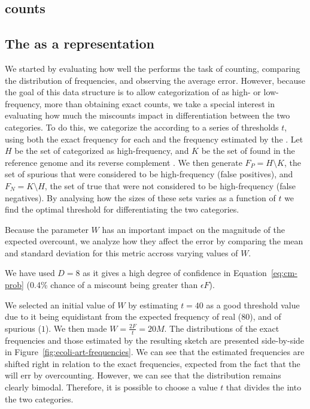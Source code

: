 \subsection{\kmer counts}

\subsection{The \dBCM as a \dBG representation}

We started by evaluating how well the \dBCM performs the task of \kmer counting, comparing the distribution of frequencies, and observing the average error. However, because the goal of this data structure is to allow categorization of  as high- or low-frequency, more than obtaining exact \kmer counts, we take a special interest in evaluating how much the miscounts impact in differentiation between the two categories. To do this, we categorize the  according to a series of thresholds $t$, using both the exact frequency for each \kmer and the frequency estimated by the \dBCM. Let $H$ be the set of  categorized as high-frequency, and $K$ be the set of  found in the reference genome  and its reverse complement . We then generate $F_P = H \setminus K$, the set of spurious  that were considered to be high-frequency (false positives), and $F_N = K \setminus H$, the set of true  that were not considered to be high-frequency (false negatives). By analysing how the sizes of these sets varies as a function of $t$ we find the optimal threshold for differentiating the two categories.

Because the parameter $W$ has an important impact on the magnitude of the expected overcount, we analyze how they affect the error by comparing the mean and standard deviation for this metric accross varying values of $W$.

We have used $D = 8$ as it gives a high degree of confidence in Equation~\ref{eq:cm-prob} (0.4\% chance of a miscount being greater than $\epsilon F$).

We selected an initial value of $W$ by estimating $t = 40$ as a good threshold value due to it being equidistant from the expected frequency of real  ($80$), and of spurious  ($1$). We then made $W = \frac{2F}{t} = 20M$. The distributions of the exact frequencies and those estimated by the resulting \dBCM sketch are presented side-by-side in Figure~\ref{fig:ecoli-art-frequencies}. We can see that the estimated frequencies are shifted right in relation to the exact frequencies, expected from the fact that the \dBCM will err by overcounting. However, we can see that the distribution remains clearly bimodal. Therefore, it is possible to choose a value $t$ that divides the  into the two categories.

